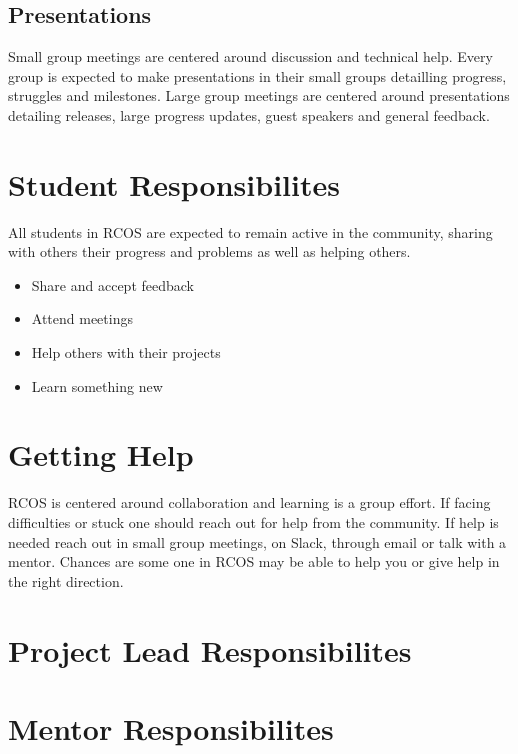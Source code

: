 \documentclass[12pt]{article}
\begin{document}
    \subsection{Presentations}

    Small group meetings are centered around discussion and technical help. Every group is expected to make presentations in their small groups detailling progress, struggles and milestones. Large group meetings are centered around presentations detailing releases, large progress updates, guest speakers and general feedback.


    \section{Student Responsibilites}

    All students in RCOS are expected to remain active in the community, sharing with others their progress and problems as well as helping others.

    \begin{itemize}
        \item Share and accept feedback
        \item Attend meetings
        \item Help others with their projects
        \item Learn something new
    \end{itemize}

    \section{Getting Help}

    RCOS is centered around collaboration and learning is a group effort. If facing difficulties or stuck one should reach out for help from the community. If help is needed reach out in small group meetings, on Slack, through email or talk with a mentor. Chances are some one in RCOS may be able to help you or give help in the right direction.
    
    \section{Project Lead Responsibilites}


    \section{Mentor Responsibilites}
\end{document}
